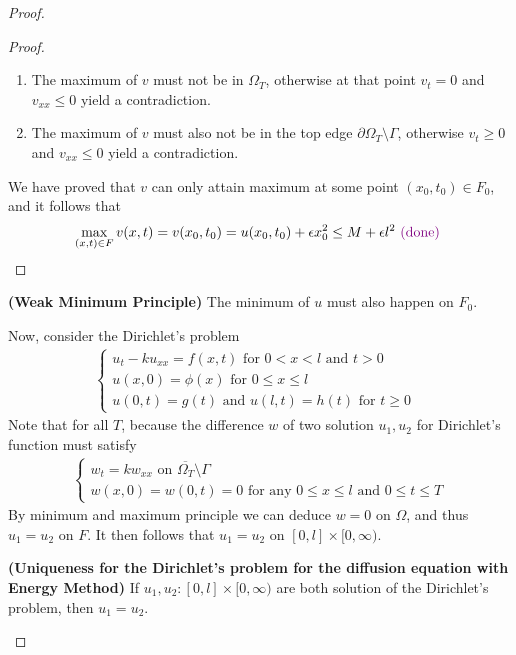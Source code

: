 \documentclass{report}
\begin{document}
\begin{proof}
\begin{proof}
\begin{enumerate}[label=(\alph*)]
  \item The maximum of $v$ must not be in $\Omega_T$, otherwise at that point $v_t=0$ and  $v_{xx}\leq 0$ yield a contradiction. 
  \item The maximum of $v$ must also not be in the top edge $\partial \Omega_T \setminus \Gamma $, otherwise $v_t\geq 0$ and $v_{xx}\leq 0$ yield a contradiction. 
\end{enumerate}
We have proved that $v$ can only attain maximum at some point $(x_0,t_0)\in F_0$, and it follows that 
\begin{align*}
\max_{(x,t) \in F}v(x,t)=v(x_0,t_0)=u(x_0,t_0)+\epsilon  x_0^2 \leq M+ \epsilon l^2  \textcolor{violet}{\text{ (done) }}
\end{align*}
\end{proof}
\begin{corollary}
\textbf{(Weak Minimum Principle)} The minimum of $u$ must also happen on $F_0$.  
\end{corollary}
\begin{mdframed}
Now, consider the Dirichlet's problem 
\begin{align}
\label{Dirichlet's problem}
\begin{cases}
u_t-ku_{xx}=f(x,t)\text{ for }0<x<l\text{ and }t>0 \\
u(x,0)=\phi (x)\text{ for $0\leq x\leq l$ }\\
u(0,t)=g(t)\text{ and }u(l,t)=h(t)\text{ for $t\geq 0$ }
\end{cases}
\end{align}
Note that for all $T$, because the difference $w$ of two solution  $u_1,u_2$ for Dirichlet's function must satisfy 
\begin{align*}
\begin{cases}
  w_t=kw_{xx}\text{ on }\overline{\Omega_T}\setminus  \Gamma \\
  w(x,0)=w(0,t)=0\text{ for any }0\leq x\leq l\text{ and }0\leq t\leq T
\end{cases}
\end{align*}
By minimum and maximum principle we can deduce $w=0$ on  $\Omega$, and thus  $u_1=u_2$ on  $F$. It then follows that  $u_1=u_2$ on  $[0,l]\times [0,\infty)$. 
\end{mdframed}
\begin{theorem}
\textbf{(Uniqueness for the Dirichlet's problem for the diffusion equation with Energy Method)} If $u_1,u_2:[0,l]\times [0,\infty)$ are both solution of the Dirichlet's problem, then  $u_1=u_2$. 

\end{theorem}
\end{proof}
\end{document}
